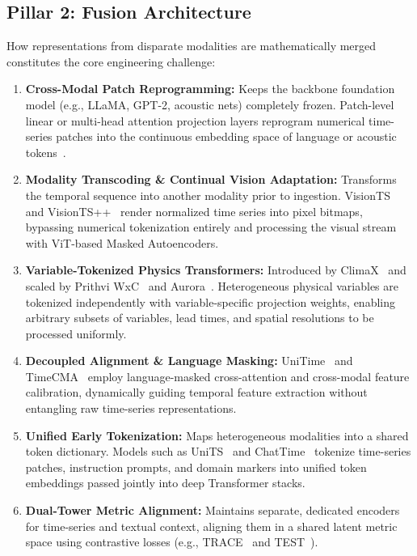 \subsection{Pillar 2: Fusion Architecture}
How representations from disparate modalities are mathematically merged constitutes the core engineering challenge:
\begin{enumerate}
    \item \textbf{Cross-Modal Patch Reprogramming:} Keeps the backbone foundation model (e.g., LLaMA, GPT-2, acoustic nets) completely frozen. Patch-level linear or multi-head attention projection layers reprogram numerical time-series patches into the continuous embedding space of language or acoustic tokens~\cite{Yang2021Voice2Series,Jin2023TimeLLM,Zhou2023OneFitsAll,Chang2023LLM4TS,Liu2024CALF}.
    \item \textbf{Modality Transcoding \& Continual Vision Adaptation:} Transforms the temporal sequence into another modality prior to ingestion. VisionTS~\cite{Chen2024VisionTS} and VisionTS++~\cite{Chen2025VisionTSPlus} render normalized time series into pixel bitmaps, bypassing numerical tokenization entirely and processing the visual stream with ViT-based Masked Autoencoders.
    \item \textbf{Variable-Tokenized Physics Transformers:} Introduced by ClimaX~\cite{Nguyen2023ClimaX} and scaled by Prithvi WxC~\cite{Schmude2024PrithviWxC} and Aurora~\cite{Bodnar2024Aurora}. Heterogeneous physical variables are tokenized independently with variable-specific projection weights, enabling arbitrary subsets of variables, lead times, and spatial resolutions to be processed uniformly.
    \item \textbf{Decoupled Alignment \& Language Masking:} UniTime~\cite{Liu2024UniTime} and TimeCMA~\cite{Liu2024TimeCMA} employ language-masked cross-attention and cross-modal feature calibration, dynamically guiding temporal feature extraction without entangling raw time-series representations.
    \item \textbf{Unified Early Tokenization:} Maps heterogeneous modalities into a shared token dictionary. Models such as UniTS~\cite{Gao2024UniTS} and ChatTime~\cite{ChatTime2024} tokenize time-series patches, instruction prompts, and domain markers into unified token embeddings passed jointly into deep Transformer stacks.
    \item \textbf{Dual-Tower Metric Alignment:} Maintains separate, dedicated encoders for time-series and textual context, aligning them in a shared latent metric space using contrastive losses (e.g., TRACE~\cite{Chen2025TRACE} and TEST~\cite{Sun2023TEST}).
\end{enumerate}

